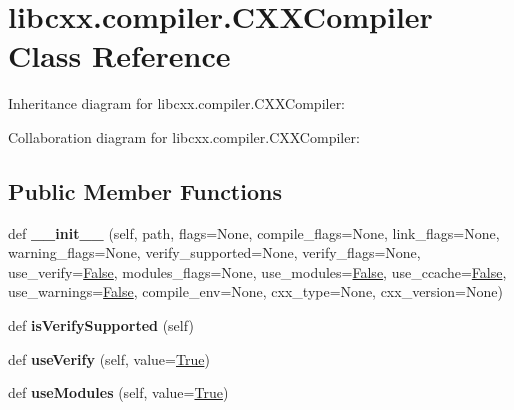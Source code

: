 \hypertarget{classlibcxx_1_1compiler_1_1_c_x_x_compiler}{}\section{libcxx.\+compiler.\+C\+X\+X\+Compiler Class Reference}
\label{classlibcxx_1_1compiler_1_1_c_x_x_compiler}


Inheritance diagram for libcxx.\+compiler.\+C\+X\+X\+Compiler\+:


Collaboration diagram for libcxx.\+compiler.\+C\+X\+X\+Compiler\+:
\subsection*{Public Member Functions}
\begin{DoxyCompactItemize}
\item 
\mbox{\label{classlibcxx_1_1compiler_1_1_c_x_x_compiler_ad1e6c26e147e409ed1e8a61b2f17fc59}} 
def {\bfseries \+\_\+\+\_\+init\+\_\+\+\_\+} (self, path, flags=None, compile\+\_\+flags=None, link\+\_\+flags=None, warning\+\_\+flags=None, verify\+\_\+supported=None, verify\+\_\+flags=None, use\+\_\+verify=\mbox{\hyperlink{struct_false}{False}}, modules\+\_\+flags=None, use\+\_\+modules=\mbox{\hyperlink{struct_false}{False}}, use\+\_\+ccache=\mbox{\hyperlink{struct_false}{False}}, use\+\_\+warnings=\mbox{\hyperlink{struct_false}{False}}, compile\+\_\+env=None, cxx\+\_\+type=None, cxx\+\_\+version=None)
\item 
\mbox{\label{classlibcxx_1_1compiler_1_1_c_x_x_compiler_a84c0daf9ac32375b38e03fd1c59cd2ef}} 
def {\bfseries is\+Verify\+Supported} (self)
\item 
\mbox{\label{classlibcxx_1_1compiler_1_1_c_x_x_compiler_aa6f39c6ff11372d136d6289724398a84}} 
def {\bfseries use\+Verify} (self, value=\mbox{\hyperlink{struct_true}{True}})
\item 
\mbox{\label{classlibcxx_1_1compiler_1_1_c_x_x_compiler_aecae2bbf92f51227b7d9a77afed4b37a}} 
def {\bfseries use\+Modules} (self, value=\mbox{\hyperlink{struct_true}{True}})
\item 
\mbox{\label{classlibcxx_1_1compiler_1_1_c_x_x_compiler_abb4dedba9255e9e94318071b2698fdcf}} 

\end{DoxyCompactItemize}
